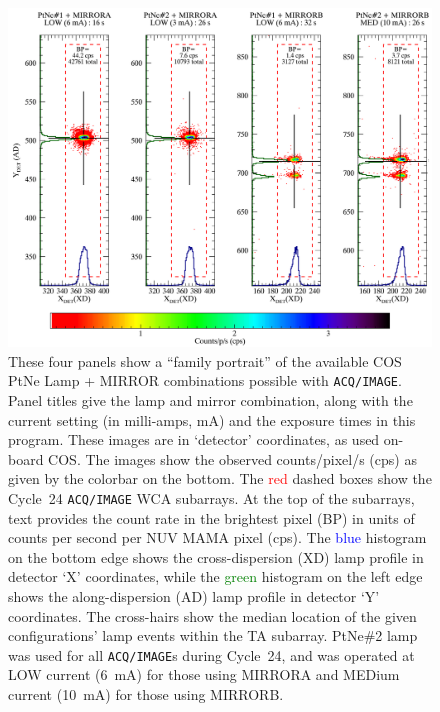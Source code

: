 \documentclass[12pt]{reportj}
\newcommand{\tacq}[1]{\texttt{ACQ/#1}}
\begin{document}
	\begin{figure}[!htb]
		\vspace{1.3cm}
		\centering
		\includegraphics[width=\textwidth]{C24_14857_FP.png}
		\caption{These four panels show a ``family portrait'' of the available COS PtNe Lamp + MIRROR combinations possible with \tacq{IMAGE}. Panel titles give the lamp and mirror combination, along with the current setting (in milli-amps, mA) and the exposure times in this program.
		These images are in `detector' coordinates, as used on-board COS.
		The images show the observed counts/pixel/s (cps) as given by the colorbar on the bottom.
		The \textcolor{red}{red} dashed boxes show the Cycle~24 \tacq{IMAGE} WCA subarrays. At the top of the subarrays, text provides the count rate in the brightest pixel (BP) in units of counts per second per NUV MAMA pixel (cps).
		The \textcolor{blue}{blue} histogram on the bottom edge shows the cross-dispersion (XD) lamp profile in detector `X' coordinates, while
		the \textcolor{green}{green} histogram on the left edge shows the along-dispersion (AD) lamp profile in detector `Y' coordinates.
		The cross-hairs show the median location of the given configurations' lamp events within the TA subarray.
		PtNe\#2 lamp was used for all \tacq{IMAGE}s during Cycle~24, and was operated at LOW current (6~mA) for those using MIRRORA and MEDium current (10~mA) for those using MIRRORB.
		}
		\label{fig:FP}
		\vspace{1.3cm}
	\end{figure}
\end{document}
